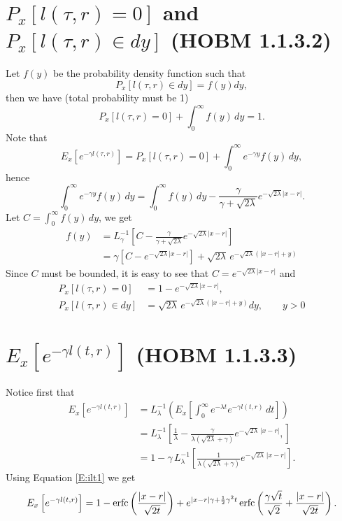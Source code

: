 \section{ $P_x[l(\tau,r)=0]$ and $P_x[l(\tau,r)\in dy]$ (HOBM 1.1.3.2)}
Let $f(y)$ be the probability density function such that
\[
  P_x[l(\tau,r)\in dy] = f(y) dy,
\]
then we have (total probability must be 1)
\[
  P_x[l(\tau,r)=0] + \int_0^{\infty} f(y) \, dy = 1.
\]
Note that
\[
  E_x \left[ e^{-\gamma l(\tau,r)} \right] 
    = P_x[l(\tau,r)=0] + \int_0^{\infty} e^{-\gamma y} f(y) \, dy,
\]
hence 
\[
  \int_0^{\infty} e^{-\gamma y} f(y) \, dy = \int_0^{\infty} f(y)\, dy
    - \frac{\gamma}{\gamma+\sqrt{2\lambda}} e^{-\sqrt{2\lambda} |x-r|}.
\]
Let $C=\int_0^{\infty} f(y) \, dy$, we get
\begin{align*}
  f(y) &= L_{\gamma}^{-1} 
          \left[
            C - \frac{\gamma}{\gamma+\sqrt{2\lambda}} e^{-\sqrt{2\lambda}|x-r|}
          \right]   \\
       &= \gamma [C- e^{-\sqrt{2\lambda} |x-r|}]
          + \sqrt{2\lambda}\, e^{-\sqrt{2\lambda} (|x-r|+y)}
\end{align*}
Since $C$ must be bounded, it is easy to see that $C= e^{-\sqrt{2\lambda}|x-r|}$
and
\begin{align}
  P_x[l(\tau,r)=0] &= 1 - e^{-\sqrt{2\lambda}|x-r|},   \\
  P_x[l(\tau,r)\in dy] &= \sqrt{2\lambda}\, e^{-\sqrt{2\lambda} (|x-r|+y)} dy,
    \qquad y>0
\end{align}




\section{ $E_x[ e^{-\gamma l(t,r)} ]$ (HOBM 1.1.3.3)}
Notice first that
\begin{align*}
  E_x \left[ e^{-\gamma l(t,r)} \right] 
    &= L_{\lambda}^{-1} 
         \left(
           E_x 
             \left[ 
               \int_0^{\infty} e^{-\lambda t} e^{-\gamma l(t,r)} \, dt 
             \right]
         \right) \\
    &= L_{\lambda}^{-1} 
       \left[
         \frac{1}{\lambda} - \frac{\gamma}{\lambda (\sqrt{2\lambda}+\gamma)} 
                             e^{-\sqrt{2\lambda}\,|x-r|},
       \right]  \\
    &= 1 - \gamma \, L_{\lambda}^{-1} 
       \left[
         \frac{1}{\lambda (\sqrt{2\lambda}+\gamma)} e^{-\sqrt{2\lambda}\,|x-r|}
       \right].  
\end{align*}
Using Equation \ref{E:ilt1} we get
\begin{equation}
  E_x \left[ e^{-\gamma l(t,r)} \right] 
    = 1 - \operatorname*{erfc} \left( \frac{|x-r|}{\sqrt{2t}} \right)
      + e^{|x-r|\gamma + \frac{1}{2}\gamma^2 t}
        \operatorname*{erfc} 
          \left( 
            \frac{\gamma \sqrt{t}}{\sqrt{2}} + \frac{|x-r|}{\sqrt{2t}}    
          \right).
\end{equation}


